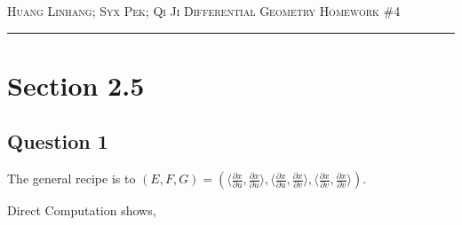 \documentclass[12pt]{article}
\begin{document}
\thispagestyle{empty}

{\scshape Huang Linhang; Syx Pek; Qi Ji} \hfill {\scshape \large Differential Geometry} \hfill {\scshape Homework \#4}
 
\smallskip
\hrule
\bigskip
\section{Section 2.5}
\subsection*{Question 1}
The general recipe is to $(E, F, G) = (\langle \frac{ \partial x}{\partial u},\frac{ \partial x}{\partial u}\rangle, \langle\frac{ \partial x}{\partial u},\frac{ \partial x}{\partial v}\rangle,\langle\frac{ \partial x}{\partial v},\frac{ \partial x}{\partial v}\rangle)$.

Direct Computation shows,
\end{document}
